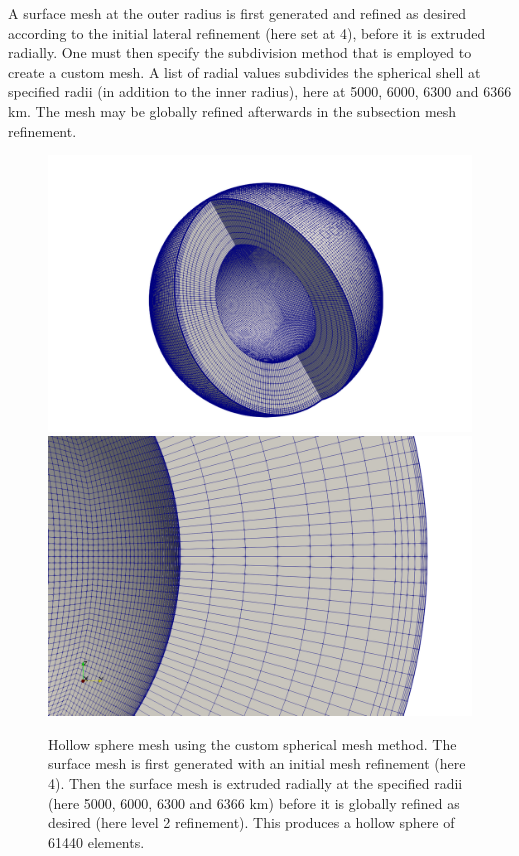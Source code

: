 A surface mesh at the outer radius is first generated and refined as desired according to the initial lateral refinement (here set at 4), before it is extruded radially. One must then specify the subdivision method that is employed to create a custom mesh. A list of radial values subdivides the spherical shell at specified radii (in addition to the inner radius), here at 5000, 6000, 6300 and 6366 \si{km}. The mesh may be globally refined afterwards in the subsection mesh refinement.

\begin{figure}[h!]
\centering
\includegraphics[width=0.48\linewidth]{../../benchmarks/gravity_prem/doc/custom_shell_full.png}
\includegraphics[width=0.48\linewidth]{../../benchmarks/gravity_prem/doc/custom_shell_zoom.png}
\caption{Hollow sphere mesh using the custom spherical mesh method. The surface mesh is first generated with an initial mesh refinement (here 4). Then the surface mesh is extruded radially at the specified radii (here 5000, 6000, 6300 and 6366 \si{km}) before it is globally refined as desired (here level 2 refinement). This produces a hollow sphere of 61440 elements.}
\label{fig:gravityline}
\end{figure}

